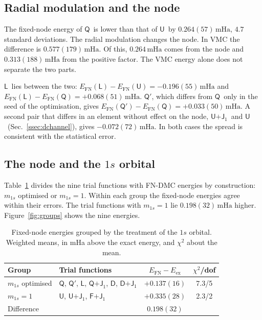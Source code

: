 \documentclass[aps,prb,reprint,amsmath,amssymb,superscriptaddress,nofootinbib]{revtex4-2}
\newcommand{\mQ}{\ensuremath{\textsf{Q}}}
\newcommand{\mQb}{\ensuremath{\textsf{Q}'}}
\newcommand{\mL}{\ensuremath{\textsf{L}}}
\newcommand{\mU}{\ensuremath{\textsf{U}}}
\newcommand{\mQJ}{\ensuremath{\textsf{Q+J}_1}}
\newcommand{\mUJ}{\ensuremath{\textsf{U+J}_1}}
\newcommand{\mFJ}{\ensuremath{\textsf{F+J}_1}}
\newcommand{\mD}{\ensuremath{\textsf{D}}}
\newcommand{\mDJ}{\ensuremath{\textsf{D+J}_1}}
\newcommand{\mHa}{\,\mathrm{mHa}}
\begin{document}
\subsection{Radial modulation and the node}
\label{ssec:modulation}

The fixed-node energy of \mQ\ is lower than that of \mU\ by $0.264(57)\mHa$,
$4.7$ standard deviations. The radial modulation changes the node. In VMC the
difference is $0.577(179)\mHa$. Of this, $0.264\mHa$ comes from the node and
$0.313(188)\mHa$ from the positive factor. The VMC energy alone does not
separate the two parts.

\mL\ lies between the two: $E_{\mathrm{FN}}(\mL) - E_{\mathrm{FN}}(\mU) =
-0.196(55)\mHa$ and $E_{\mathrm{FN}}(\mL) - E_{\mathrm{FN}}(\mQ) =
+0.068(51)\mHa$. \mQb, which differs from \mQ\ only in the seed of the
optimisation, gives $E_{\mathrm{FN}}(\mQb) - E_{\mathrm{FN}}(\mQ) =
+0.033(50)\mHa$. A second pair that differs in an element without effect on
the node, \mUJ\ and \mU\ (Sec.~\ref{ssec:dchannel}), gives $-0.072(72)\mHa$.
In both cases the spread is consistent with the statistical error.

\subsection{The node and the $1s$ orbital}
\label{ssec:onebody}

Table~\ref{tab:groups} divides the nine trial functions with FN-DMC energies
by construction: $m_{1s}$ optimised or $m_{1s} = 1$. Within each group the
fixed-node energies agree within their errors. The trial functions with
$m_{1s} = 1$ lie $0.198(32)\mHa$ higher. Figure~\ref{fig:groups} shows the
nine energies.

\begin{table}[t]
\caption{Fixed-node energies grouped by the treatment of the $1s$ orbital.
Weighted means, in mHa above the exact energy, and $\chi^2$ about the mean.}
\label{tab:groups}
\centering
\small
\setlength{\tabcolsep}{4pt}
\begin{tabular}{llcc}
\hline\hline
Group & Trial functions & $E_{\mathrm{FN}} - E_{\mathrm{ex}}$ & $\chi^2$/dof \\
\hline
$m_{1s}$ optimised & \parbox[t]{2.6cm}{\raggedright \mQ, \mQb, \mL, \mQJ, \mD, \mDJ} & $+0.137(16)$ & 7.3/5 \\
$m_{1s} = 1$       & \mU, \mUJ, \mFJ               & $+0.335(28)$ & 2.3/2 \\
Difference         &                                & $0.198(32)$  &       \\
\hline\hline
\end{tabular}
\end{table}
\end{document}
